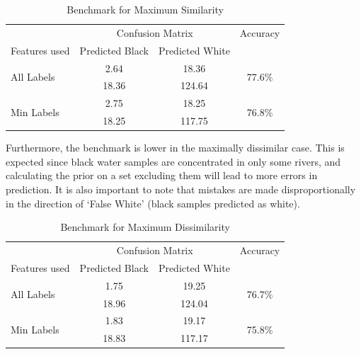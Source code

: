 \begin{table}
	\centering
		\caption{Benchmark for Maximum Similarity}
	\label{table:benchmarksim}
	\begin{tabular}{l c c c}
		\toprule 
		&\multicolumn{2}{c}{Confusion Matrix} &Accuracy\\
		Features used & Predicted Black&Predicted White&\\ 
		
		\midrule
		\multirow{2}{*}{All Labels }& 	2.64 & 18.36&		\multirow{2}{*}{77.6\%}\\
					&	18.36 &124.64&\\
		\cmidrule{2-3}
		\multirow{2}{*}{Min Labels}  &2.75 & 18.25&		\multirow{2}{*}{76.8\%}\\
		&18.25& 117.75&\\
		\bottomrule

	\end{tabular}

\end{table}
Furthermore, the benchmark is lower in the maximally dissimilar case. This is expected since black water samples are concentrated in only some rivers, and calculating the prior on a set excluding them will lead to more errors in prediction. It is also important to note that mistakes are made disproportionally in the direction of `False White' (black samples predicted as white).

\begin{table}[!h]
	\centering
		\caption{Benchmark for Maximum Dissimilarity}
	\label{table:benchmarkdissim}
	\begin{tabular}{l c c c }
		\toprule 
		&\multicolumn{2}{c}{Confusion Matrix} & Accuracy\\
		Features used & Predicted Black&Predicted White&\\ 
		
		\midrule
		\multirow{2}{*}{All Labels }&  1.75 &19.25&\multirow{2}{*}{76.7\%}\\
								  &	 18.96&124.04 &\\
		\cmidrule{2-3}
		\multirow{2}{*}{Min Labels}    &1.83&19.17&\multirow{2}{*}{75.8\% }\\
									&18.83&117.17&\\
		\bottomrule

	\end{tabular}

\end{table}

